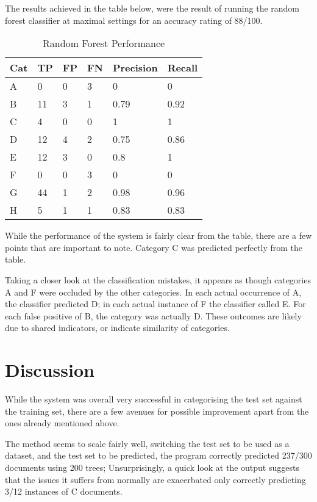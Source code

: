 \documentclass[11pt]{article}
\begin{document}
The results achieved in the table below, were the result of running the random
forest classifier at maximal settings for an accuracy rating of 88/100.

\begin{table}[h]
\begin{center}
    \begin{tabular}{|l|l|l|l|l|l|}
        \hline
        Cat & TP & FP & FN & Precision & Recall \\
        \hline \hline
        A & 0   & 0 & 3 & 0    & 0      \\
        B & 11  & 3 & 1 & 0.79 & 0.92   \\
        C & 4   & 0 & 0 & 1    & 1      \\
        D & 12  & 4 & 2 & 0.75 & 0.86   \\
        E & 12  & 3 & 0 & 0.8  & 1      \\
        F & 0   & 0 & 3 & 0    & 0      \\
        G & 44  & 1 & 2 & 0.98 & 0.96   \\
        H & 5   & 1 & 1 & 0.83 & 0.83   \\
        \hline
    \end{tabular}
\caption{Random Forest Performance}\label{table1}
\end{center}
\end{table}

While the performance of the system is fairly clear from the table, there are a
few points that are important to note. Category C was predicted perfectly from
the table.

Taking a closer look at the classification mistakes, it appears as though
categories A and F were occluded by the other categories. In each actual
occurrence of A, the classifier predicted D; in each actual instance of F the
classifier called E. For each false positive of B, the category was actually D.
These outcomes are likely due to shared indicators, or indicate similarity of
categories.

\section{Discussion}

While the system was overall very successful in categorising the test set
against the training set, there are a few avenues for possible improvement
apart from the ones already mentioned above.

The method seems to scale fairly well, switching the test set to be used as a
dataset, and the test set to be predicted, the program correctly predicted
237/300 documents using 200 trees; Unsurprisingly, a quick look at the output
suggests that the issues it suffers from normally are exacerbated only
correctly predicting 3/12 instances of C documents.
\end{document}
